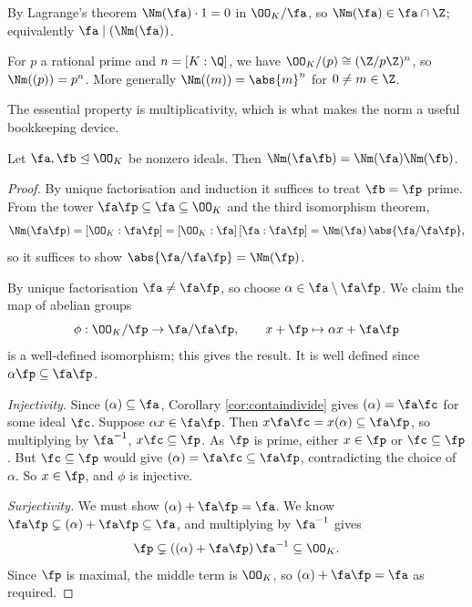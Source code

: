 By Lagrange's theorem $\Nm(\fa)\cdot 1 = 0$ in $\OO_K/\fa$, so $\Nm(\fa) \in \fa \cap \Z$; equivalently $\fa \mid (\Nm(\fa))$.

\begin{example}
	For $p$ a rational prime and $n = [K:\Q]$, we have $\OO_K/(p) \cong (\Z/p\Z)^n$, so $\Nm((p)) = p^n$. More generally $\Nm((m)) = \abs{m}^n$ for $0 \neq m \in \Z$.
\end{example}

The essential property is multiplicativity, which is what makes the norm a useful bookkeeping device.

\begin{proposition}\label{prop:normmult}
	Let $\fa, \fb \trianglelefteq \OO_K$ be nonzero ideals. Then $\Nm(\fa\fb) = \Nm(\fa)\Nm(\fb)$.
\end{proposition}

\begin{proof}
	By unique factorisation and induction it suffices to treat $\fb = \fp$ prime. From the tower $\fa\fp \subseteq \fa \subseteq \OO_K$ and the third isomorphism theorem,
	$$\Nm(\fa\fp) = [\OO_K : \fa\fp] = [\OO_K:\fa]\,[\fa : \fa\fp] = \Nm(\fa)\,\abs{\fa/\fa\fp},$$
	so it suffices to show $\abs{\fa/\fa\fp} = \Nm(\fp)$.

	By unique factorisation $\fa \neq \fa\fp$, so choose $\alpha \in \fa \setminus \fa\fp$. We claim the map of abelian groups
	$$\phi : \OO_K/\fp \to \fa/\fa\fp, \qquad x + \fp \mapsto \alpha x + \fa\fp$$
	is a well-defined isomorphism; this gives the result. It is well defined since $\alpha\fp \subseteq \fa\fp$.

	\emph{Injectivity.} Since $(\alpha) \subseteq \fa$, Corollary \ref{cor:containdivide} gives $(\alpha) = \fa\fc$ for some ideal $\fc$. Suppose $\alpha x \in \fa\fp$. Then $x\fa\fc = x(\alpha) \subseteq \fa\fp$, so multiplying by $\fa^{-1}$, $x\fc \subseteq \fp$. As $\fp$ is prime, either $x \in \fp$ or $\fc \subseteq \fp$. But $\fc \subseteq \fp$ would give $(\alpha) = \fa\fc \subseteq \fa\fp$, contradicting the choice of $\alpha$. So $x \in \fp$, and $\phi$ is injective.

	\emph{Surjectivity.} We must show $(\alpha) + \fa\fp = \fa$. We know $\fa\fp \subsetneq (\alpha)+\fa\fp \subseteq \fa$, and multiplying by $\fa^{-1}$ gives
	$$\fp \subsetneq \left((\alpha)+\fa\fp\right)\fa^{-1} \subseteq \OO_K.$$
	Since $\fp$ is maximal, the middle term is $\OO_K$, so $(\alpha)+\fa\fp = \fa$ as required.
\end{proof}

